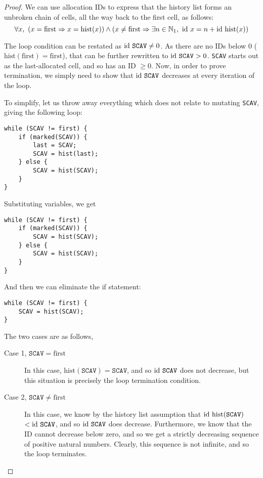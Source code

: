 \begin{proof}
We can use allocation IDs to express that the history list forms an
unbroken chain of cells, all the way back to the first cell, as
follows:
\[\forall x,\ \left(x = \mathrm{first} \Rightarrow x =
  \mathrm{hist}(x)\right) \land \left(x \neq \mathrm{first} \Rightarrow
  \exists n \in \mathbb N_{1},\ \mathrm{id}~x = n +
  \mathrm{id}~\mathrm{hist}(x)\right)\]

The loop condition can be restated as $\mathrm{id}~\mathtt{SCAV} \neq 0$. As
there are no IDs below 0 ($\mathrm{hist}(\mathrm{first}) =
\mathrm{first}$), that can be further rewritten to $\mathrm{id}~\mathtt{SCAV}
> 0$. \texttt{SCAV} starts out as the last-allocated cell, and so has
an ID $\geq 0$. Now, in order to prove termination, we simply need to
show that $\mathrm{id}~\mathtt{SCAV}$ decreases at every iteration of the
loop.

To simplify, let us throw away everything which does not relate to
mutating \texttt{SCAV}, giving the following loop:

\begin{lstlisting}
while (SCAV != first) {
    if (marked(SCAV)) {
        last = SCAV;
        SCAV = hist(last);
    } else {
        SCAV = hist(SCAV);
    }
}
\end{lstlisting}

Substituting variables, we get

\begin{lstlisting}
while (SCAV != first) {
    if (marked(SCAV)) {
        SCAV = hist(SCAV);
    } else {
        SCAV = hist(SCAV);
    }
}
\end{lstlisting}

And then we can eliminate the if statement:

\begin{lstlisting}
while (SCAV != first) {
    SCAV = hist(SCAV);
}
\end{lstlisting}

The two cases are as follows,

\begin{description}
  \item[Case 1, $\mathtt{SCAV} = \mathrm{first}$] In this case,
    $\mathrm{hist}(\mathtt{SCAV}) = \mathtt{SCAV}$, and so
    $\mathrm{id}~\mathtt{SCAV}$ does not decrease, but this situation is
    precisely the loop termination condition.

  \item[Case 2, $\mathtt{SCAV} \neq \mathrm{first}$] In this case, we
    know by the history list assumption that
    $\mathrm{id}~\mathrm{hist}(\mathtt{SCAV})$ $<\mathrm{id}~\mathtt{SCAV}$, and so
    $\mathrm{id}~\mathtt{SCAV}$ does decrease. Furthermore, we know that the
    ID cannot decrease below zero, and so we get a strictly decreasing
    sequence of positive natural numbers. Clearly, this sequence is
    not infinite, and so the loop terminates.
\end{description}
\end{proof}

